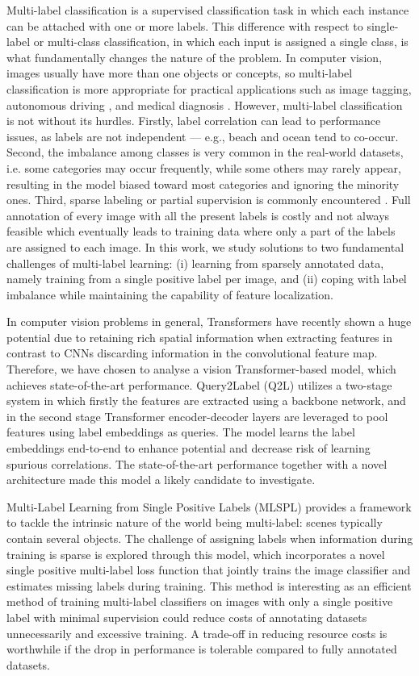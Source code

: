 \documentclass[lettersize,journal]{IEEEtran}
\begin{document}
Multi-label classification is a supervised classification task in which each instance can be attached with one or more labels. This difference with respect to single-label or multi-class classification, in which each input is assigned a single class, is what fundamentally changes the nature of the problem. In computer vision, images usually have more than one objects or concepts, so multi-label classification is more appropriate for practical applications such as image tagging, autonomous driving \cite{WU2024105189}, and medical diagnosis \cite{ge2018chestxraysclassificationmultilabel}.
However, multi-label classification is not without its hurdles. Firstly, label correlation can lead to performance issues, as labels are not independent — e.g., beach and ocean tend to co-occur. Second, the imbalance among classes is very common in the real-world datasets, i.e. some categories may occur frequently, while some others may rarely appear, resulting in the model biased toward most categories and ignoring the minority ones. Third, sparse labeling or partial supervision is commonly encountered \cite{mlsp}. Full annotation of every image with all the present labels is costly and not always feasible which eventually leads to training data where only a part of the labels are assigned to each image.
In this work, we study solutions to two fundamental challenges of multi-label learning: (i) learning from sparsely annotated data, namely training from a single positive label per image, and (ii) coping with label imbalance while maintaining the capability of feature localization. 

In computer vision problems in general, Transformers have recently shown a huge potential due to retaining rich spatial information when extracting features in contrast to CNNs discarding information in the convolutional feature map. Therefore, we have chosen to analyse a vision Transformer-based model, which achieves state-of-the-art performance. Query2Label (Q2L) utilizes a two-stage system in which firstly the features are extracted using a backbone network, and in the second stage Transformer encoder-decoder layers are leveraged to pool features using label embeddings as queries. The model learns the label embeddings end-to-end to enhance potential and decrease risk of learning spurious correlations. The state-of-the-art performance together with a novel architecture made this model a likely candidate to investigate. 

Multi-Label Learning from Single Positive Labels (MLSPL) provides a framework to tackle the intrinsic nature of the world being multi-label: scenes typically contain several objects. The challenge of assigning labels when information during training is sparse is explored through this model, which incorporates a novel single positive multi-label loss function that jointly trains the image classifier and estimates missing labels during training. This method is interesting as an efficient method of training multi-label classifiers on images with only a single positive label with minimal supervision could reduce costs of annotating datasets unnecessarily and excessive training. A trade-off in reducing resource costs is worthwhile if the drop in performance is tolerable compared to fully annotated datasets. 
\end{document}
